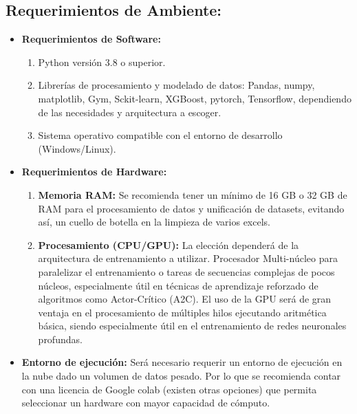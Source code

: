\documentclass[12pt,a4paper]{article}
\begin{document}
        \subsection{\textbf{Requerimientos de Ambiente:}}
                    \begin{itemize}
                        \item \textbf{Requerimientos de Software:} 
                        \begin{enumerate}
                            \item Python versión 3.8 o superior.
                            \item Librerías de procesamiento y modelado de datos: Pandas, numpy, matplotlib, Gym, Sckit-learn, XGBoost, pytorch, Tensorflow, dependiendo de las necesidades y arquitectura a escoger.
                            \item Sistema operativo compatible con el entorno de desarrollo (Windows/Linux).
                        \end{enumerate}
                        \item \textbf{Requerimientos de Hardware:}
                        \begin{enumerate}
                            \item \textbf{Memoria RAM:} Se recomienda tener un mínimo de 16 GB o 32 GB de RAM para el procesamiento de datos y unificación de datasets, evitando así, un cuello de botella en la limpieza de varios excels.
                            \item \textbf{Procesamiento (CPU/GPU):} La elección dependerá de la arquitectura de entrenamiento a utilizar. Procesador Multi-núcleo para paralelizar el entrenamiento o tareas de secuencias complejas de pocos núcleos, especialmente útil en técnicas de aprendizaje reforzado de algoritmos como Actor-Crítico (A2C). El uso de la GPU será de gran ventaja en el procesamiento de múltiples hilos ejecutando aritmética básica, siendo especialmente útil en el entrenamiento de redes neuronales profundas. 
                        \end{enumerate}
                        \item \textbf{Entorno de ejecución:} Será necesario requerir un entorno de ejecución en la nube dado un volumen de datos pesado. Por lo que se recomienda contar con una licencia de Google colab (existen otras opciones) que permita seleccionar un hardware con mayor capacidad de cómputo. 
                    \end{itemize}
                
\end{document}
